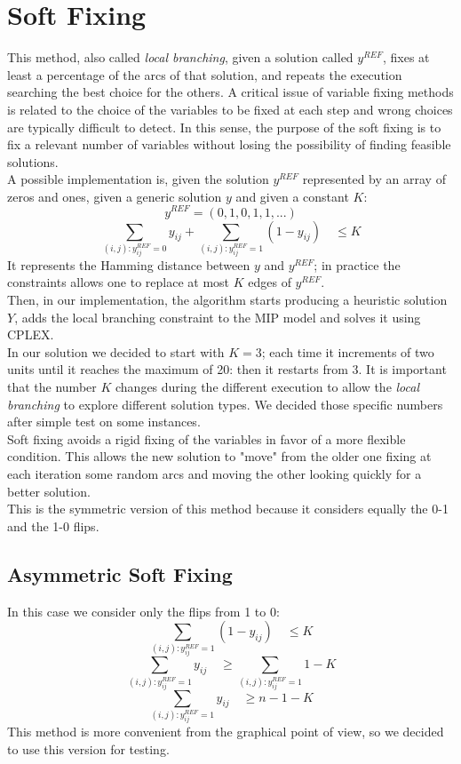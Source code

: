 \section{Soft Fixing}
This method, also called \textit{local branching}, given a solution called $y^{REF}$, fixes at least a percentage of the arcs of that solution, and repeats the execution searching the best choice for the others. A critical issue of variable fixing methods is related to the choice of the variables to be fixed at each step and wrong choices are typically difficult to detect. In this sense, the purpose of the soft fixing is to fix a relevant number of variables without losing the possibility of finding feasible solutions.\\
A possible implementation is, given the solution $y^{REF}$ represented by an array of zeros and ones, given a generic solution $y$ and given a constant $K$:
\[
	y^{REF} = (0,1,0,1,1,...)
\]
\[
	\sum_{(i,j):y^{REF}_{ij}=0} y_{ij} + \sum_{(i,j):y^{REF}_{ij}=1} (1-y_{ij}) \quad \leq K
\]
It represents the Hamming distance between $y$ and $y^{REF}$; in practice the constraints allows one to replace at most $K$ edges of $y^{REF}$. \\
Then, in our implementation, the algorithm starts producing a heuristic solution $Y$, adds the local branching constraint to the MIP model and solves it using \textsc{CPLEX}.\\
In our solution we decided to start with $K=3$; each time it increments of two units until it reaches the maximum of 20: then it restarts from 3. It is important that the number $K$ changes during the different execution to allow the \textit{local branching} to explore different solution types. We decided those specific numbers after simple test on some instances.\\
Soft fixing avoids a rigid fixing of the variables in favor of a more flexible condition. This allows the new solution to "move" from the older one fixing at each iteration some random arcs and moving the other looking quickly for a better solution.\\
This is the symmetric version of this method because it considers equally the 0-1 and the 1-0 flips. 
\newpage
\subsection{Asymmetric Soft Fixing}
In this case we consider only the flips from 1 to 0:
\[
	\sum_{(i,j):y^{REF}_{ij}=1} (1-y_{ij}) \quad \leq K
\]
\[
	\sum_{(i,j):y^{REF}_{ij}=1} y_{ij} \quad \geq \sum_{(i,j):y^{REF}_{ij}=1} 1 - K
\]
\[
	\sum_{(i,j):y^{REF}_{ij}=1} y_{ij} \quad \geq n - 1 - K
\]
This method is more convenient from the graphical point of view, so we decided to use this version for testing. 
